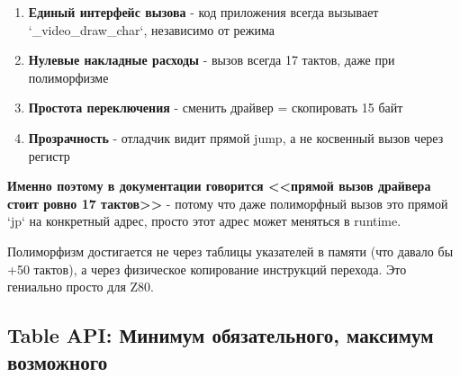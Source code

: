 \documentclass[11pt,a4paper]{scrartcl}
\begin{document}
\begin{enumerate}
\begin{enumerate}
\begin{enumerate}
\item \textbf{Единый интерфейс вызова} - код приложения всегда вызывает `\_video\_draw\_char`, независимо от режима
\item \textbf{Нулевые накладные расходы} - вызов всегда 17 тактов, даже при полиморфизме
\item \textbf{Простота переключения} - сменить драйвер = скопировать 15 байт
\item \textbf{Прозрачность} - отладчик видит прямой jump, а не косвенный вызов через регистр
\end{enumerate}

\textbf{\textbf{Именно поэтому в документации говорится {}<<прямой вызов драйвера стоит ровно 17 тактов>>{}}} - потому что даже полиморфный вызов это прямой `jp` на конкретный адрес, просто этот адрес может меняться в runtime.

Полиморфизм достигается не через таблицы указателей в памяти (что давало бы +50 тактов), а через физическое копирование инструкций перехода. Это гениально просто для Z80.
\end{enumerate}
\end{enumerate}
\subsection{Table API: Минимум обязательного, максимум возможного}
\label{sec:orgddb65a5}
\end{document}
